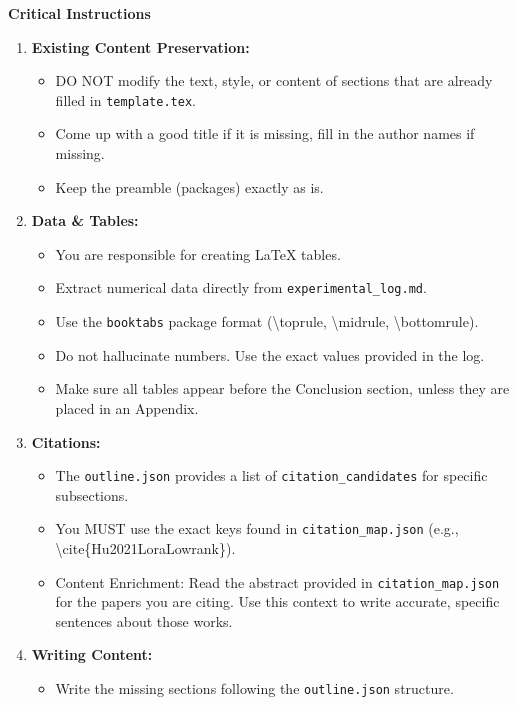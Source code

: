 \vspace{1em}
\noindent\textbf{Critical Instructions}
\begin{enumerate}
    \item \textbf{Existing Content Preservation:} 
    \begin{itemize}
        \item DO NOT modify the text, style, or content of sections that are already filled in \texttt{template.tex}. 
        \item Come up with a good title if it is missing, fill in the author names if missing.
        \item Keep the preamble (packages) exactly as is.
    \end{itemize}
    \item \textbf{Data \& Tables:}
    \begin{itemize}
        \item You are responsible for creating LaTeX tables.
        \item Extract numerical data directly from \texttt{experimental\_log.md}.
        \item Use the \texttt{booktabs} package format (\textbackslash{}toprule, \textbackslash{}midrule, \textbackslash{}bottomrule).
        \item Do not hallucinate numbers. Use the exact values provided in the log.
        \item Make sure all tables appear before the Conclusion section, unless they are placed in an Appendix.
    \end{itemize}
    \item \textbf{Citations:}
    \begin{itemize}
        \item The \texttt{outline.json} provides a list of \texttt{citation\_candidates} for specific subsections.
        \item You MUST use the exact keys found in \texttt{citation\_map.json} (e.g., \textbackslash{}cite\{Hu2021LoraLowrank\}).
        \item Content Enrichment: Read the abstract provided in \texttt{citation\_map.json} for the papers you are citing. Use this context to write accurate, specific sentences about those works.
    \end{itemize}
    \item \textbf{Writing Content:}
    \begin{itemize}
        \item Write the missing sections following the \texttt{outline.json} structure.

\end{itemize}
\end{enumerate}
